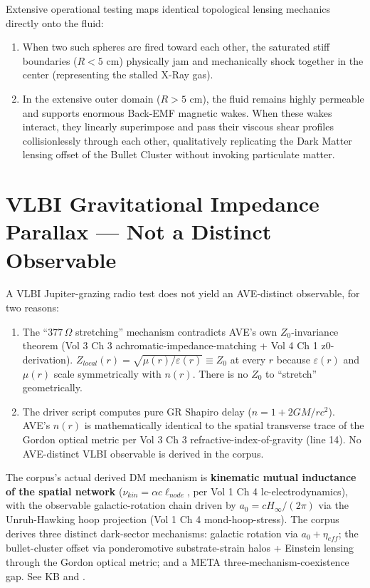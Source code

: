 Extensive operational testing maps identical topological lensing mechanics directly onto the fluid:
\begin{enumerate}
    \item When two such spheres are fired toward each other, the saturated stiff boundaries ($R < 5\text{ cm}$) physically jam and mechanically shock together in the center (representing the stalled X-Ray gas).
    \item In the extensive outer domain ($R > 5\text{ cm}$), the fluid remains highly permeable and supports enormous Back-EMF magnetic wakes. When these wakes interact, they linearly superimpose and pass their viscous shear profiles collisionlessly through each other, qualitatively replicating the Dark Matter lensing offset of the Bullet Cluster without invoking particulate matter.
\end{enumerate}

\section{VLBI Gravitational Impedance Parallax --- Not a Distinct Observable}

A VLBI Jupiter-grazing radio test does not yield an AVE-distinct observable, for two reasons:

\begin{enumerate}
    \item The ``$377\,\Omega$ stretching'' mechanism contradicts AVE's own $Z_0$-invariance theorem (Vol 3 Ch 3 achromatic-impedance-matching + Vol 4 Ch 1 z0-derivation). $Z_{local}(r) = \sqrt{\mu(r)/\varepsilon(r)} \equiv Z_0$ at every $r$ because $\varepsilon(r)$ and $\mu(r)$ scale symmetrically with $n(r)$. There is no $Z_0$ to ``stretch'' geometrically.
    \item The driver script  computes pure GR Shapiro delay ($n = 1 + 2GM/rc^2$). AVE's $n(r)$ is mathematically identical to the spatial transverse trace of the Gordon optical metric per Vol 3 Ch 3 refractive-index-of-gravity (line 14). No AVE-distinct VLBI observable is derived in the corpus.
\end{enumerate}

The corpus's actual derived DM mechanism is \textbf{kinematic mutual inductance of the spatial network} ($\nu_{kin} = \alpha c \ell_{node}$, per Vol 1 Ch 4 lc-electrodynamics), with the observable galactic-rotation chain driven by $a_0 = c H_\infty / (2\pi)$ via the Unruh-Hawking hoop projection (Vol 1 Ch 4 mond-hoop-stress). The corpus derives three distinct dark-sector mechanisms: galactic rotation via $a_0 + \eta_{eff}$; the bullet-cluster offset via ponderomotive substrate-strain halos + Einstein lensing through the Gordon optical metric; and a META three-mechanism-coexistence gap. See KB  and .

